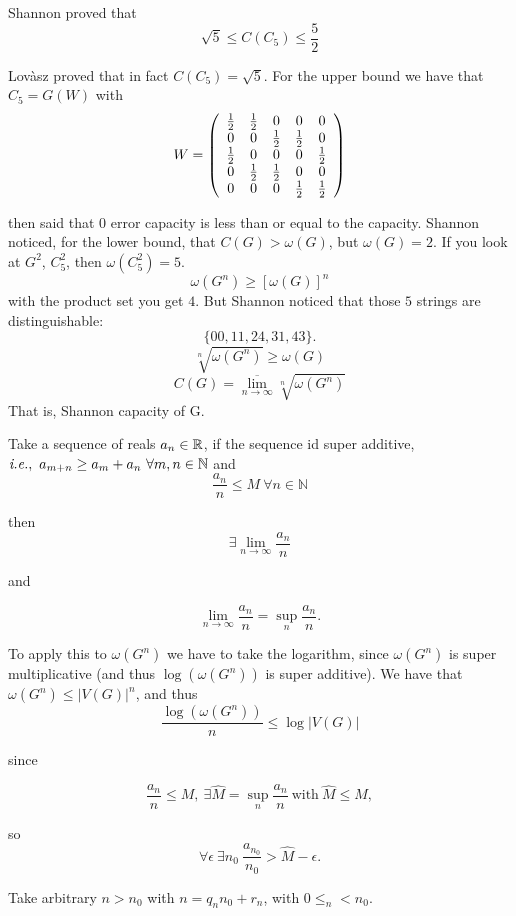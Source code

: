 Shannon proved that
\[
\sqrt{5} \leq C(C_5) \leq \dfrac{5}{2}
\]

Lovàsz proved that in fact $C(C_5) = \sqrt{5}$. For the upper bound we have that $C_5 = G(W)$ with
\[
 W = \left(\begin{array}{c c c c c}
 \frac{1}{2} &\frac{1}{2} & 0&0&0\\
 0&0&\frac{1}{2}&\frac{1}{2}&0\\
 \frac{1}{2}&0&0&0&\frac{1}{2}\\
 0&\frac{1}{2}&\frac{1}{2}&0&0\\
 0&0&0&\frac{1}{2}&\frac{1}{2}\\
 \end{array}\right)
\]

then said that 0 error capacity is less than or equal to the capacity. Shannon noticed, for the lower bound, that $C(G) > \omega(G)$, but $\omega(G) = 2$. If you look at $G^2$, \ie $C_5^2$, then $\omega(C_5^2) = 5$.
\[
\omega(G^n) \geq [\omega(G)]^n
\]
with the product set you get $4$. But Shannon noticed that those $5$ strings are distinguishable:
\[
\{00,11,24,31,43\}.
\]
\[
 \sqrt[n]{\omega(G^n)} \geq \omega(G)
\]
\[
 C(G) = \overline{\lim_{n\rightarrow \infty}}\sqrt[n]{\omega(G^n)}
\]
That is, Shannon capacity of G.

\begin{lem}[Fevete]
Take a sequence of reals $a_n \in \mathbb{R}$, if the sequence id super additive, $\textit{i.e.},\ a_{m+n} \geq a_m + a_n\ \forall m, n \in \mathbb{N}$ and
\[
 \dfrac{a_n}{n} \leq M\ \forall n \in \mathbb{N}
\]

then
\[
 \exists \lim_{n \rightarrow \infty}  \dfrac{a_n}{n} 
\]

and

\[
\lim_{n \rightarrow \infty}  \dfrac{a_n}{n} = \sup_n \dfrac{a_n}{n}. 
\]
 
\end{lem}

To apply this to $\omega(G^n)$ we have to take the logarithm, since $\omega(G^n)$ is super multiplicative (and thus $\log(\omega(G^n))$ is super additive). We have that $\omega(G^n) \leq |V(G)|^n$, and thus
\[
 \dfrac{\log(\omega(G^n))}{n} \leq \log|V(G)|
\]

since 

\[
 \dfrac{a_n}{n} \leq M,\ \exists \hat{M} = \sup_n \dfrac{a_n}{n}\ \text{with}\ \hat{M} \leq M,
\]

so
\[
 \forall \epsilon\ \exists n_0\ \dfrac{a_{n_0}}{n_0} > \hat{M} - \epsilon.  
\]

Take arbitrary $n > n_0$ with $n = q_nn_0 +r_n$, with $0 \leq _n < n_0$.

